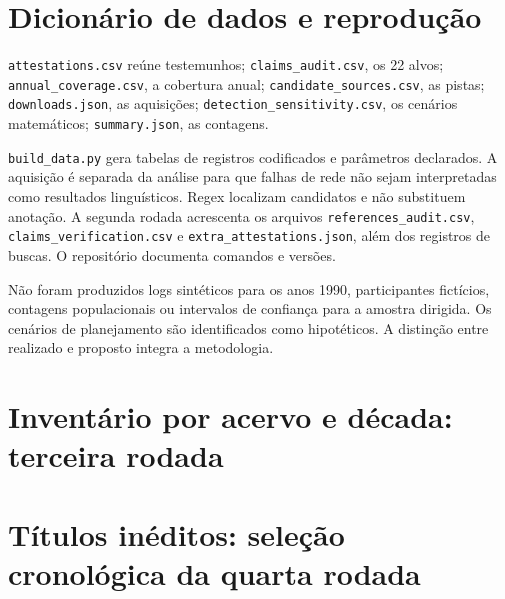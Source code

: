 \section{Dicionário de dados e reprodução}
\texttt{attestations.csv} reúne testemunhos; \texttt{claims\_audit.csv}, os 22 alvos; \texttt{annual\_coverage.csv}, a cobertura anual; \texttt{candidate\_sources.csv}, as pistas; \texttt{downloads.json}, as aquisições; \texttt{detection\_sensitivity.csv}, os cenários matemáticos; \texttt{summary.json}, as contagens.

\texttt{build\_data.py} gera tabelas de registros codificados e parâmetros declarados. A aquisição é separada da análise para que falhas de rede não sejam interpretadas como resultados linguísticos. Regex localizam candidatos e não substituem anotação. A segunda rodada acrescenta os arquivos \texttt{references\_audit.csv}, \texttt{claims\_verification.csv} e \texttt{extra\_attestations.json}, além dos registros de buscas. O repositório documenta comandos e versões.

Não foram produzidos logs sintéticos para os anos 1990, participantes fictícios, contagens populacionais ou intervalos de confiança para a amostra dirigida. Os cenários de planejamento são identificados como hipotéticos. A distinção entre realizado e proposto integra a metodologia.

\section{Inventário por acervo e década: terceira rodada}




\clearpage
\section{Títulos inéditos: seleção cronológica da quarta rodada}

